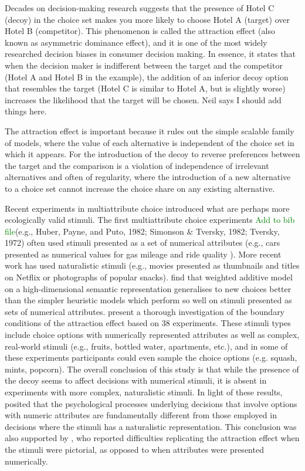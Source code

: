 \documentclass[12pt, a4paper]{article}
\newcommand{\NS}[1] {{\textcolor{green}{#1}}}
\begin{document}
Decades on decision-making research suggests that the presence of Hotel C (decoy) in the choice set makes you more likely to choose Hotel A (target) over Hotel B (competitor). This phenomenon is called the attraction effect (also known as asymmetric dominance effect), and it is one of the most widely researched decision biases in consumer decision making. In essence, it states that when the decision maker is indifferent between the target and the competitor (Hotel A and Hotel B in the example), the addition of an inferior decoy option that resembles the target (Hotel C is similar to Hotel A, but is slightly worse) increases the likelihood that the target will be chosen. Neil says I should add things here.


The attraction effect is important because it rules out the simple scalable family of models, where the value of each alternative is independent of the choice set in which it appears. For the introduction of the decoy to reverse preferences between the target and the comparison is a violation of independence of irrelevant alternatives and often of regularity, where the introduction of a new alternative to a choice set cannot increase the choice share on any existing alternative.

Recent experiments in multiattribute choice introduced what are perhaps more ecologically valid stimuli. The first multiattribute choice experiments \NS{Add to bib file}(e.g., Huber, Payne, and Puto, 1982; Simonson \& Tversky, 1982; Tversky, 1972) often used stimuli presented as a set of numerical attributes (e.g., cars presented as numerical values for gas mileage and ride quality ). More recent work has used naturalistic stimuli (e.g., movies presented as thumbnails and titles on Netflix or photographs of popular snacks).  find that weighted additive model on a high-dimensional semantic representation generalises to new choices better than the simpler heuristic models which perform so well on stimuli presented as sets of numerical attributes.  present a thorough investigation of the boundary conditions of the attraction effect based on 38 experiments. These stimuli types include choice options with numerically represented attributes as well as complex, real-world stimuli (e.g., fruits, bottled water, apartments, etc.), and in some of these experiments participants could even sample the choice options (e.g. squash, mints, popcorn). The overall conclusion of this study is that while the presence of the decoy seems to affect decisions with numerical stimuli, it is absent in experiments with more complex, naturalistic stimuli. In light of these results, \citeauthor{Frederick2014} posited that the psychological processes underlying decisions that involve options with numeric attributes are fundamentally different from those employed in decisions where the stimuli has a naturalistic representation. This conclusion was also supported by , who reported difficulties replicating the attraction effect when the stimuli were pictorial, as opposed to when attributes were presented numerically.
\end{document}
